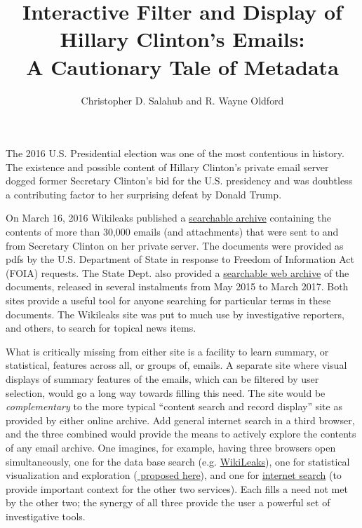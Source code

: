\documentclass[journal]{vgtc}                %
\title{Interactive Filter and Display of Hillary Clinton's Emails: \\A Cautionary Tale of Metadata}
\author{Christopher D. Salahub and R. Wayne Oldford}
\begin{document}
\maketitle
The 2016 U.S. Presidential election was one of the most contentious in history.  The existence and possible content of Hillary Clinton's private email server dogged former Secretary Clinton's bid for the U.S. presidency and was doubtless a contributing factor to her surprising defeat by Donald Trump.

On March 16, 2016 Wikileaks published a \href{https://wikileaks.org/clinton-emails/}{\color{blue}searchable archive} \cite{Wikileaks} containing the contents of more than 30,000 emails (and attachments) that were sent to and from Secretary Clinton on her private server.  The documents were provided as pdfs by the U.S. Department of State in response to Freedom of Information Act (FOIA) \cite{FOIA} requests.  The State Dept. also provided a \href{https://foia.state.gov/Search/Results.aspx?collection=Clinton_Email}{\color{blue}searchable web archive} of the documents, released in several instalments from May 2015 to March 2017\cite{StateDeptFOIA}.   Both sites provide a  useful tool for anyone searching for particular terms in these documents.  The Wikileaks site was put to much use by investigative reporters, and others, to search for topical news items.

What is critically missing from either site is a facility to learn summary, or statistical, features across all, or groups of,  emails.   A separate site where visual displays of summary features of the emails, which can be filtered by user selection, would go a long way towards filling this need.  The site would be \emph{complementary} to the more typical ``content search and record display'' site as provided by either online archive.   Add general internet search in a third browser, and the three combined would provide the means to actively explore the contents of any email archive.    One imagines, for example, having three browsers open simultaneously, one for the data base search (e.g. \href{https://wikileaks.org/clinton-emails/}{\color{blue}WikiLeaks}), one for statistical visualization and exploration (\href{https://rshiny.math.uwaterloo.ca/clinton}{\color{blue} proposed here}), and one for \href{https://google.com}{\color {blue} internet search} (to provide important context for the other two services).  Each fills a need not met by the other two; the synergy of all three provide the user a powerful set of investigative tools.
\end{document}
